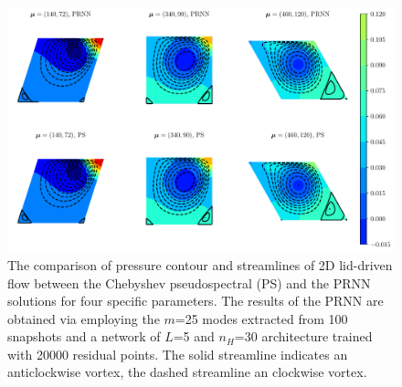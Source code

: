 \documentclass[preprint, 10pt]{elsarticle}
\begin{document}
\begin{figure}[!ht]
  \centering
  \includegraphics[width=14cm]{../../pythonNN/2DLidDriven/fig/ResultComparsion.pdf}
\caption{The comparison of pressure contour and streamlines of 2D lid-driven flow between the Chebyshev pseudospectral (PS) and the PRNN solutions for four specific parameters. The results of the PRNN are obtained via employing the $m$=25 modes extracted from 100 snapshots and a network of $L$=5 and $n_H$=30 architecture trained with 20000 residual points. The solid streamline indicates an anticlockwise vortex, the dashed streamline an clockwise vortex.}
\label{fig_2DLidDrivenResultComparsion}
\end{figure}
\end{document}
